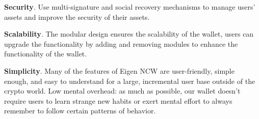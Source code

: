\textbf{Security}. Use multi-signature and social recovery mechanisms to manage users' assets and improve the security of their assets.
\newline

\textbf{Scalability}. The modular design ensures the scalability of the wallet, users can upgrade the functionality by adding and removing modules to enhance the functionality of the wallet.
\newline

\textbf{Simplicity}. Many of the features of Eigen NCW are user-friendly, simple enough, and easy to understand for a large, incremental user base outside of the crypto world. Low mental overhead: as much as possible, our wallet doesn't require users to learn strange new habits or exert mental effort to always remember to follow certain patterns of behavior.
